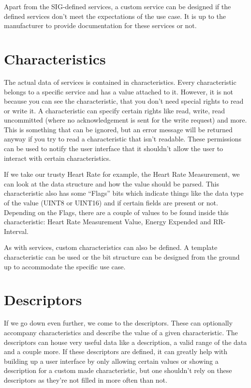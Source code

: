 \documentclass[pdftex,a4paper,12pt,twoside]{report}
\begin{document}
Apart from the SIG-defined services, a custom service can be designed if the defined services don't meet the expectations of the use case. It is up to the manufacturer to provide documentation for these services or not.

\section{Characteristics}
\label{sec:characteristics}
The actual data of services is contained in characteristics. Every characteristic belongs to a specific service and has a value attached to it. However, it is not because you can see the characteristic, that you don't need special rights to read or write it. A characteristic can specify certain rights like read, write, read uncommitted (where no acknowledgement is sent for the write request) and more. This is something that can be ignored, but an error message will be returned anyway if you try to read a characteristic that isn't readable. These permissions can be used to notify the user interface that it shouldn't allow the user to interact with certain characteristics.

If we take our trusty Heart Rate for example, the Heart Rate Measurement, we can look at the data structure and how the value should be parsed. This characteristic also has some ``Flags'' bits which indicate things like the data type of the value (UINT8 or UINT16) and if certain fields are present or not. Depending on the Flags, there are a couple of values to be found inside this characteristic: Heart Rate Measurement Value, Energy Expended and RR-Interval.

As with services, custom characteristics can also be defined. A template characteristic can be used or the bit structure can be designed from the ground up to accommodate the specific use case.

\section{Descriptors}
\label{sec:descriptors}
If we go down even further, we come to the descriptors. These can optionally accompany characteristics and describe the value of a given characteristic. The descriptors can house very useful data like a description, a valid range of the data and a couple more. If these descriptors are defined, it can greatly help with building up a user interface by only allowing certain values or showing a description for a custom made characteristic, but one shouldn't rely on these descriptors as they're not filled in more often than not.
\end{document}
